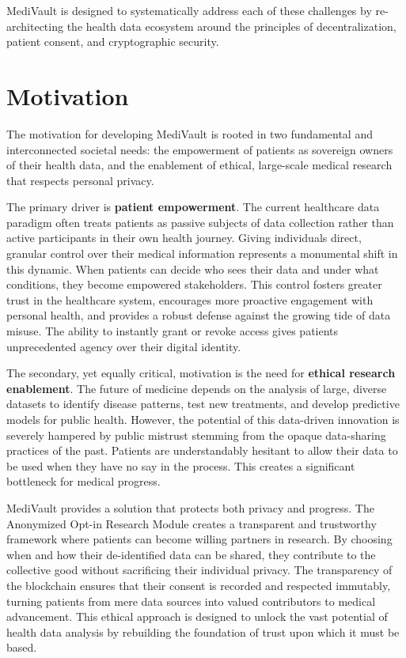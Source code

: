 MediVault is designed to systematically address each of these challenges by re-architecting the health data ecosystem around the principles of decentralization, patient consent, and cryptographic security.

\section{Motivation}
The motivation for developing MediVault is rooted in two fundamental and interconnected societal needs: the empowerment of patients as sovereign owners of their health data, and the enablement of ethical, large-scale medical research that respects personal privacy.

The primary driver is \textbf{patient empowerment}. The current healthcare data paradigm often treats patients as passive subjects of data collection rather than active participants in their own health journey. Giving individuals direct, granular control over their medical information represents a monumental shift in this dynamic. When patients can decide who sees their data and under what conditions, they become empowered stakeholders. This control fosters greater trust in the healthcare system, encourages more proactive engagement with personal health, and provides a robust defense against the growing tide of data misuse. The ability to instantly grant or revoke access gives patients unprecedented agency over their digital identity.

The secondary, yet equally critical, motivation is the need for \textbf{ethical research enablement}. The future of medicine depends on the analysis of large, diverse datasets to identify disease patterns, test new treatments, and develop predictive models for public health. However, the potential of this data-driven innovation is severely hampered by public mistrust stemming from the opaque data-sharing practices of the past. Patients are understandably hesitant to allow their data to be used when they have no say in the process. This creates a significant bottleneck for medical progress.

MediVault provides a solution that protects both privacy and progress. The Anonymized Opt-in Research Module creates a transparent and trustworthy framework where patients can become willing partners in research. By choosing when and how their de-identified data can be shared, they contribute to the collective good without sacrificing their individual privacy. The transparency of the blockchain ensures that their consent is recorded and respected immutably, turning patients from mere data sources into valued contributors to medical advancement. This ethical approach is designed to unlock the vast potential of health data analysis by rebuilding the foundation of trust upon which it must be based.

